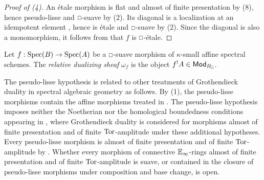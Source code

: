 \begin{proof}[Proof of (4)]
    An \'{e}tale morphism is flat and almost of finite presentation by  (8), hence pseudo-lisse and $\msld$-suave by (2). Its diagonal is a localization at an idempotent element \cite[Rmk. 7.5.0.2, Thm. 7.5.0.6 \& Ex. 7.5.0.7]{HA}, hence is \'{e}tale and $\msld$-suave by (2). Since the diagonal is also a monomorphism, it follows from \cite[Def. 4.6.1]{HeyerMann6FF} that $f$ is $\msld$-\'{e}tale. 
\end{proof}
\begin{definition}\label{def: relative dualizing sheaf}
    Let $f:\operatorname{Spec}(B)\to\operatorname{Spec}(A)$ be a $\msld$-suave morphism of $\kappa$-small affine spectral schemes. The \emph{relative dualizing sheaf} $\omega_{f}$ is the object $f^{!}A\in\Mod_{B_{\sld}}$.
\end{definition}
\begin{remark}\label{rmk: comparison to lurie jiang}
    The pseudo-lisse hypothesis is related to other treatments of Grothendieck duality in spectral algebraic geometry as follows. By  (1), the pseudo-lisse morphisms contain the affine morphisms treated in \cite[\S 6]{SAG}. The pseudo-lisse hypothesis imposes neither the Noetherian nor the homological boundedness conditions appearing in \cite[\S 2]{JiangGD}, where Grothendieck duality is considered for morphisms almost of finite presentation and of finite $\mathrm{Tor}$-amplitude under these additional hypotheses. Every pseudo-lisse morphism is almost of finite presentation and of finite $\mathrm{Tor}$-amplitude by . Whether every morphism of connective $\mathbb{E}_{\infty}$-rings almost of finite presentation and of finite $\mathrm{Tor}$-amplitude is suave, or contained in the closure of pseudo-lisse morphisms under composition and base change, is open. 
\end{remark}
